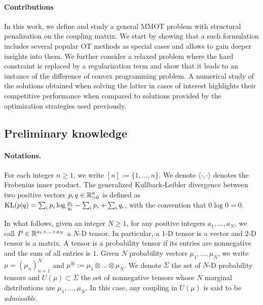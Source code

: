 \paragraph{Contributions} In this work, we define and study a general MMOT problem with structural penalization on the coupling matrix.
We start by showing that a such formulation includes several popular OT methods as special cases and allows to gain deeper insights
into them. We further consider a relaxed problem where the hard constraint is replaced by a regularization term and show that it leads
to an instance of the difference of convex programming problem. A numerical study of the solutions obtained when solving the latter
in cases of interest highlights their competitive performance when compared to solutions provided by the optimization
strategies used previously.

\subsection{Preliminary knowledge}

\paragraph{Notations.} For each integer $n \geq 1$, we write $[n] := \{1,...,n\}$.
We denote $\langle \cdot, \cdot \rangle$ denotes the Frobenius inner product.
The generalized Kullback-Leibler divergence between two positive vectors $p, q \in \mathbb R^n_{> 0}$
is defined as $\text{KL}(p | q) = \sum_i p_i \log \frac{p_i}{q_i} - \sum_i p_i + \sum_i q_i$,
with the convention that $0 \log 0 = 0$.

In what follows, given an integer $N \geq 1$, for any positive integers $a_1,..., a_N$, we call
$P \in \mathbb R^{a_1 \times ... \times a_N}$ a $N$-D tensor. In particular, a $1$-D tensor is a vector and $2$-D tensor is a matrix.
A tensor is a probability tensor if its entries are nonnegative and the sum of all entries is $1$.
Given $N$ probability vectors $\mu_1, ..., \mu_N$, we write $\mu = (\mu_n)_{n=1}^N$
and $\mu^{\otimes} := \mu_1 \otimes ... \otimes \mu_N$.
We denote $\Sigma$ the set of $N$-D probability tensors and $U(\mu) \subset \Sigma$ the set of nonnegative tensors whose $N$
marginal distributions are $\mu_1, ..., \mu_N$. In this case, any coupling in $U(\mu)$ is said to be \textit{admissible}.

